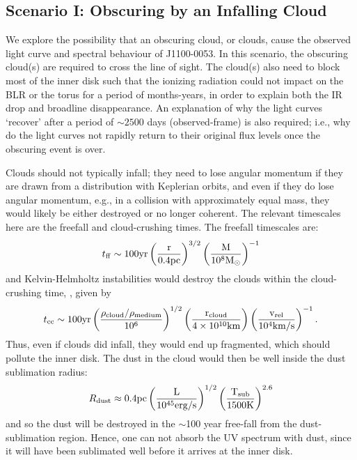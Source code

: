 \documentclass[11pt,a4paper]{article}
\begin{document}
\subsection*{Scenario I: Obscuring by an Infalling Cloud}
We explore the possibility that an obscuring cloud, or clouds, cause
the observed light curve and spectral behaviour of J1100-0053.  In
this scenario, the obscuring cloud(s) are required to cross the line
of sight. The cloud(s) also need to block most of the inner disk such
that the ionizing radiation could not impact on the BLR or the torus
for a period of months-years, in order to explain both the IR drop and
broadline disappearance. An explanation of why the light curves
`recover' after a period of $\sim 2500$ days (observed-frame) is also
required; i.e., why do the light curves not rapidly return to their
original flux levels once the obscuring event is over.

Clouds should not typically infall; they need to lose angular momentum
if they are drawn from a distribution with Keplerian orbits, and even
if they do lose angular momentum, e.g., in a collision with
approximately equal mass, they would likely be either destroyed or no
longer coherent. The relevant timescales here are the freefall and
cloud-crushing times. The freefall timescales are: 
\begin{equation}
    t_{{\rm ff}}   \sim 100   \rm{yr}  \left(\frac{r}{0.4\rm{pc}}\right)^{3/2} 
                                            \left(\frac{M}{10^{8}M_{\odot}}\right)^{-1}
\end{equation}
and Kelvin-Helmholtz instabilities would destroy the clouds within the
cloud-crushing time, \citep[e.g., ][]{Nagakura2008, Hopkins2013,
Shiokawa2015, Bae2016}, given by
\begin{equation}
    t_{\rm cc} \sim 100\rm{yr} \left(\frac{\rho_{cloud}/\rho_{medium}}{10^{6}}\right)^{1/2} 
                                            \left(\frac{r_{\rm cloud}}{4 \times 10^{10}\rm{km}}\right) 
                                            \left(\frac{v_{\rm rel}}{10^{4}\rm{km/s}}\right)^{-1}.
\end{equation}
Thus, even if clouds did infall, they would end up fragmented, which
should pollute the inner disk.  The dust in the cloud would then be
well inside the dust sublimation radius:
\begin{equation}
    R_{\rm dust} \approx 0.4\rm{pc}\left(\frac{L}{10^{45}\rm{erg/s}}\right)^{1/2}
                                                   \left(\frac{T_{\rm sub}}{1500\rm{K}}\right)^{2.6}
\end{equation}
and so the dust will be destroyed in the $\sim$100 year free-fall from
the dust-sublimation region. Hence, one can not absorb the UV spectrum
with dust, since it will have been sublimated well before it arrives
at the inner disk.
\end{document}
